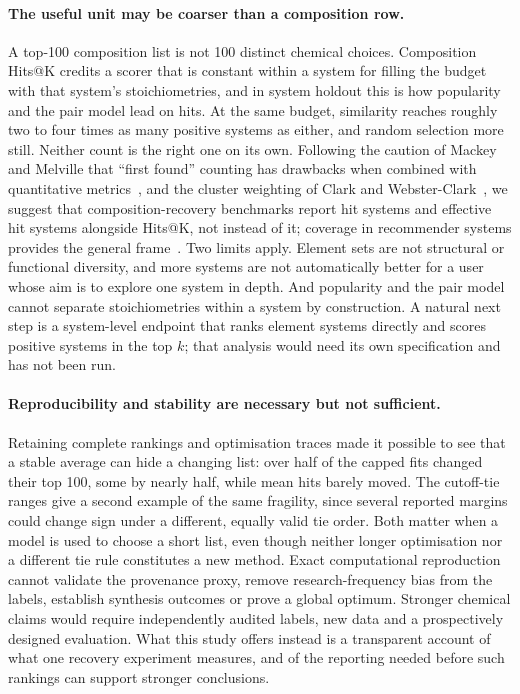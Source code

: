 \documentclass[11pt,a4paper]{article}
\begin{document}
\paragraph{The useful unit may be coarser than a composition row.}
A top-100 composition list is not 100 distinct chemical choices. Composition Hits@K credits a scorer that is constant within a system for filling the budget with that system's stoichiometries, and in system holdout this is how popularity and the pair model lead on hits. At the same budget, similarity reaches roughly two to four times as many positive systems as either, and random selection more still. Neither count is the right one on its own. Following the caution of Mackey and Melville that ``first found'' counting has drawbacks when combined with quantitative metrics~\citep{mackey2009}, and the cluster weighting of Clark and Webster-Clark~\citep{clark2008}, we suggest that composition-recovery benchmarks report hit systems and effective hit systems alongside Hits@K, not instead of it; coverage in recommender systems provides the general frame~\citep{kaminskas2016}. Two limits apply. Element sets are not structural or functional diversity, and more systems are not automatically better for a user whose aim is to explore one system in depth. And popularity and the pair model cannot separate stoichiometries within a system by construction. A natural next step is a system-level endpoint that ranks element systems directly and scores positive systems in the top $k$; that analysis would need its own specification and has not been run.

\paragraph{Reproducibility and stability are necessary but not sufficient.}
Retaining complete rankings and optimisation traces made it possible to see that a stable average can hide a changing list: over half of the capped fits changed their top 100, some by nearly half, while mean hits barely moved. The cutoff-tie ranges give a second example of the same fragility, since several reported margins could change sign under a different, equally valid tie order. Both matter when a model is used to choose a short list, even though neither longer optimisation nor a different tie rule constitutes a new method. Exact computational reproduction cannot validate the provenance proxy, remove research-frequency bias from the labels, establish synthesis outcomes or prove a global optimum. Stronger chemical claims would require independently audited labels, new data and a prospectively designed evaluation. What this study offers instead is a transparent account of what one recovery experiment measures, and of the reporting needed before such rankings can support stronger conclusions.
\end{document}
